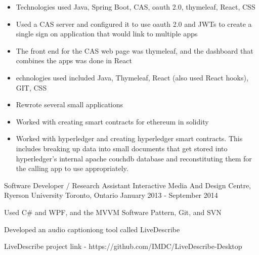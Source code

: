 \begin{cventries}
{\begin{cvitems}
{\begin{itemize}
                    \item {Technologies used Java, Spring Boot, CAS, oauth 2.0, thymeleaf, React, CSS}
                    \item {Used a CAS server and configured it to use oauth 2.0 and JWTs to create a single sign on application that would link to multiple apps}
                    \item {The front end for the CAS web page was thymeleaf, and the dashboard that combines the apps was done in React}
                \end{itemize}
            }
            \item[] {
                \begin{itemize}
                    \item {echnologies used included Java, Thymeleaf, React (also used React hooks), GIT, CSS}
                    \item {Rewrote several small applications}
                \end{itemize}
            }
            \item[] {
                \begin{itemize}
                    \item {Worked with creating smart contracts for ethereum in solidity}
                    \item {Worked with hyperledger and creating hyperledger smart contracts.
                            This includes breaking up data into small documents that get stored into hyperledger’s internal apache couchdb database and reconstituting
                            them for the calling app to use appropriately.}
                \end{itemize}
            }
        \end{cvitems}
    }

    \cventry
    {Software Developer / Research Assistant}
    {Interactive Media And Design Centre, Ryerson University}
    {Toronto, Ontario}
    {January 2013 - September 2014}
    {
        \begin{cvitems}
            \item {Used C\# and WPF, and the MVVM Software Pattern, Git, and SVN}
            \item {Developed an audio captioniong tool called LiveDescribe}
            \item {LiveDescribe project link - https://github.com/IMDC/LiveDescribe-Desktop}
        \end{cvitems}
    }
\end{cventries}